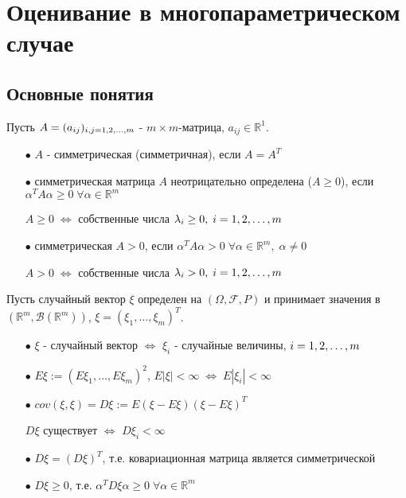 \chapter{Оценивание в многопараметрическом случае}\label{lec:5}

\section{Основные понятия}\label{lec:5/sec:1}

Пусть $A = (a_{ij})_{i,j=1,2,\dots,m}$ - $m\times m$-матрица, $a_{ij}\in \mathbb{R}^1$.

\begin{itemize}
	\item[$\bullet$] $A$ - симметрическая (симметричная), если $A = A^T$ 
	\item[$\bullet$] симметрическая матрица $A$ неотрицательно определена ($A \ge 0$), если $\alpha^T A \alpha \ge 0 \; \forall \alpha \in \mathbb{R}^m$

	$A \ge 0 \; \Leftrightarrow$ собственные числа $\lambda_i \ge 0, \; i = 1,2,\dots,m$
	\item[$\bullet$] симметрическая $A > 0$, если $\alpha^T A \alpha > 0 \; \forall \alpha \in \mathbb{R}^m, \; \alpha \not = 0$

	$A > 0 \; \Leftrightarrow$ собственные числа $\lambda_i > 0, \; i = 1,2,\dots,m$
\end{itemize}

Пусть случайный вектор $\xi$ определен на $(\Omega, \mathcal{F}, P)$ и принимает значения в $(\mathbb{R}^m, \mathcal{B}(\mathbb{R}^m))$, $\xi = (\xi_1, \dots, \xi_m)^T$.

\begin{itemize}
	\item[$\bullet$] $\xi$ - случайный вектор $\Leftrightarrow$ $\xi_i$ - случайные величины, $i = 1,2,\dots,m$
	\item[$\bullet$] $E \xi := (E \xi_1, \dots, E \xi_m)^2$, $E|\xi| < \infty \; \Leftrightarrow \; E |\xi_i| < \infty$
	\item[$\bullet$] $cov (\xi, \xi) = D \xi := E (\xi - E \xi) (\xi - E \xi)^T$

	$D \xi$ существует $\Leftrightarrow$ $D \xi_i < \infty$
	\item[$\bullet$] $D \xi = (D \xi)^T$, т.е. ковариационная матрица является симметрической
	\item[$\bullet$] $D \xi \ge 0$, т.е. $\alpha^T D \xi \alpha \ge 0 \; \forall \alpha \in \mathbb{R}^m$
\end{itemize}

